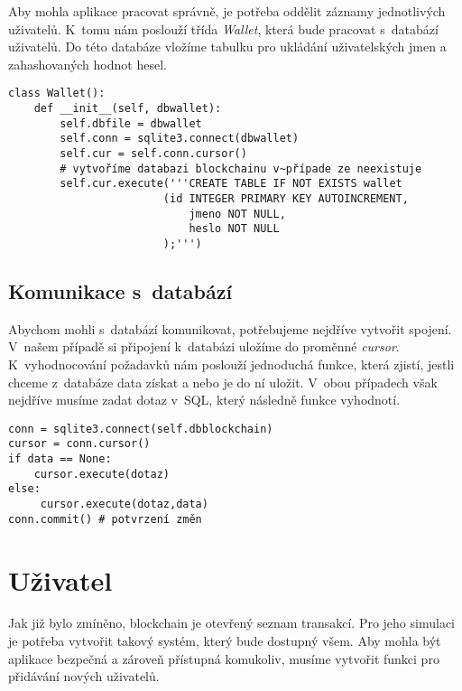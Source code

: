 \documentclass[12pt]{report}			%
\begin{document}
{Aby mohla aplikace pracovat správně, je potřeba oddělit záznamy jednotlivých uživatelů. K~tomu nám poslouží třída \textit{Wallet}, která bude pracovat s~databází uživatelů. Do této databáze vložíme tabulku pro ukládání uživatelských jmen a zahashovaných hodnot hesel.
\begin{lstlisting}
class Wallet():
    def __init__(self, dbwallet):
        self.dbfile = dbwallet
        self.conn = sqlite3.connect(dbwallet)
        self.cur = self.conn.cursor()
        # vytvoříme databazi blockchainu v~případe ze neexistuje
        self.cur.execute('''CREATE TABLE IF NOT EXISTS wallet
                        (id INTEGER PRIMARY KEY AUTOINCREMENT,
                            jmeno NOT NULL,
                            heslo NOT NULL
                        );''')
\end{lstlisting} 
	\section{Komunikace s~databází}{
Abychom mohli s~databází komunikovat, potřebujeme nejdříve vytvořit spojení. V~našem případě si připojení k~databázi uložíme do proměnné \textit{cursor}. K~vyhodnocování požadavků nám poslouží jednoduchá funkce, která zjistí, jestli chceme z~databáze data získat a nebo je do ní uložit. V~obou případech však nejdříve musíme zadat dotaz v~SQL, který následně funkce vyhodnotí.
\begin{lstlisting}
conn = sqlite3.connect(self.dbblockchain)
cursor = conn.cursor() 
if data == None:
	cursor.execute(dotaz)
else:
     cursor.execute(dotaz,data)
conn.commit() # potvrzení změn	
\end{lstlisting}
	}
	\chapter{Uživatel}{
Jak již bylo zmíněno, blockchain je otevřený seznam transakcí. Pro jeho simulaci je potřeba vytvořit takový systém, který bude dostupný všem. Aby mohla být aplikace bezpečná a zároveň přístupná komukoliv, musíme vytvořit funkci pro přidávání nových uživatelů. 

}}
\end{document}

